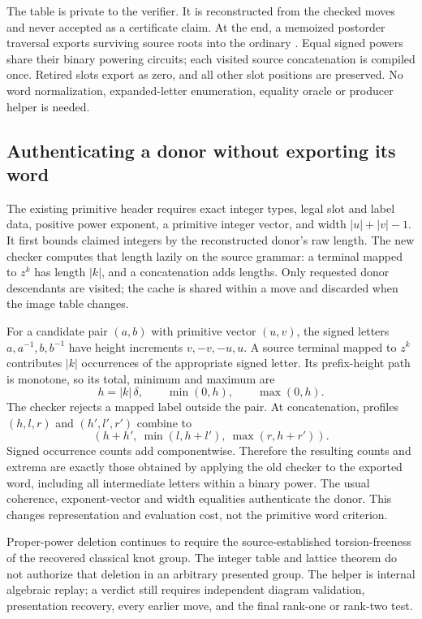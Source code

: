 The table is private to the verifier. It is reconstructed from the checked
moves and never accepted as a certificate claim. At the end, a memoized
postorder traversal exports surviving source roots into the ordinary
. Equal signed powers share their binary powering circuits;
each visited source concatenation is compiled once. Retired slots export as
zero, and all other slot positions are preserved. No word normalization,
expanded-letter enumeration, equality oracle or producer helper is needed.

\subsection{Authenticating a donor without exporting its word}

The existing primitive header requires exact integer types, legal slot and
label data, positive power exponent, a primitive integer vector, and width
$|u|+|v|-1$. It first bounds claimed integers by the reconstructed donor's
raw length. The new checker computes that length lazily on the source grammar:
a terminal mapped to $z^k$ has length $|k|$, and a concatenation adds lengths.
Only requested donor descendants are visited; the cache is shared within a
move and discarded when the image table changes.

For a candidate pair $(a,b)$ with primitive vector $(u,v)$, the signed letters
$a,a^{-1},b,b^{-1}$ have height increments $v,-v,-u,u$. A source terminal
mapped to $z^k$ contributes $|k|$ occurrences of the appropriate signed letter.
Its prefix-height path is monotone, so its total, minimum and maximum are
\[
 h=|k|\,\delta,\qquad \min(0,h),\qquad \max(0,h).
\]
The checker rejects a mapped label outside the pair. At concatenation,
profiles $(h,l,r)$ and $(h',l',r')$ combine to
\[
 (h+h',\ \min(l,h+l'),\ \max(r,h+r')).
\]
Signed occurrence counts add componentwise. Therefore the resulting counts
and extrema are exactly those obtained by applying the old checker to the
exported word, including all intermediate letters within a binary power.
The usual coherence, exponent-vector and width equalities authenticate the
donor. This changes representation and evaluation cost, not the primitive
word criterion.

Proper-power deletion continues to require the source-established
torsion-freeness of the recovered classical knot group. The integer table and
lattice theorem do not authorize that deletion in an arbitrary presented
group. The helper is internal algebraic replay; a verdict still requires
independent diagram validation, presentation recovery, every earlier move,
and the final rank-one or rank-two test.


